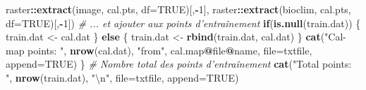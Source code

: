 \documentclass[a4paper, notitlepage, 12pt, krantz2]{krantz}
\newenvironment{Shaded}{\begin{snugshade}}{\end{snugshade}}
\newcommand{\CharTok}[1]{\textcolor[rgb]{0.31,0.60,0.02}{#1}}
\newcommand{\CommentTok}[1]{\textcolor[rgb]{0.56,0.35,0.01}{\textit{#1}}}
\newcommand{\ControlFlowTok}[1]{\textcolor[rgb]{0.13,0.29,0.53}{\textbf{#1}}}
\newcommand{\DataTypeTok}[1]{\textcolor[rgb]{0.13,0.29,0.53}{#1}}
\newcommand{\DecValTok}[1]{\textcolor[rgb]{0.00,0.00,0.81}{#1}}
\newcommand{\KeywordTok}[1]{\textcolor[rgb]{0.13,0.29,0.53}{\textbf{#1}}}
\newcommand{\NormalTok}[1]{#1}
\newcommand{\OperatorTok}[1]{\textcolor[rgb]{0.81,0.36,0.00}{\textbf{#1}}}
\newcommand{\OtherTok}[1]{\textcolor[rgb]{0.56,0.35,0.01}{#1}}
\newcommand{\StringTok}[1]{\textcolor[rgb]{0.31,0.60,0.02}{#1}}
\begin{document}
\begin{Shaded}
\begin{Highlighting}[]
\NormalTok{                     raster}\OperatorTok{::}\KeywordTok{extract}\NormalTok{(image, cal.pts, }\DataTypeTok{df=}\OtherTok{TRUE}\NormalTok{)[,}\OperatorTok{-}\DecValTok{1}\NormalTok{],}
\NormalTok{                     raster}\OperatorTok{::}\KeywordTok{extract}\NormalTok{(bioclim, cal.pts, }\DataTypeTok{df=}\OtherTok{TRUE}\NormalTok{)[,}\OperatorTok{-}\DecValTok{1}\NormalTok{])}
    \CommentTok{# ... et ajouter aux points d'entraînement}
    \ControlFlowTok{if}\NormalTok{(}\KeywordTok{is.null}\NormalTok{(train.dat)) \{}
\NormalTok{        train.dat <-}\StringTok{ }\NormalTok{cal.dat}
\NormalTok{    \} }\ControlFlowTok{else}\NormalTok{ \{}
\NormalTok{        train.dat <-}\StringTok{ }\KeywordTok{rbind}\NormalTok{(train.dat, cal.dat)}
\NormalTok{    \}}
    \KeywordTok{cat}\NormalTok{(}\StringTok{"Cal-map points: "}\NormalTok{, }\KeywordTok{nrow}\NormalTok{(cal.dat), }
        \StringTok{"from"}\NormalTok{, cal.map}\OperatorTok{@}\NormalTok{file}\OperatorTok{@}\NormalTok{name, }\DataTypeTok{file=}\NormalTok{txtfile, }\DataTypeTok{append=}\OtherTok{TRUE}\NormalTok{)}
\NormalTok{  \}}
  \CommentTok{# Nombre total des points d'entraînement}
  \KeywordTok{cat}\NormalTok{(}\StringTok{"Total points:   "}\NormalTok{, }\KeywordTok{nrow}\NormalTok{(train.dat), }\StringTok{"}\CharTok{\textbackslash{}n}\StringTok{"}\NormalTok{, }\DataTypeTok{file=}\NormalTok{txtfile, }\DataTypeTok{append=}\OtherTok{TRUE}\NormalTok{)}
  

\end{Highlighting}
\end{Shaded}
\end{document}
